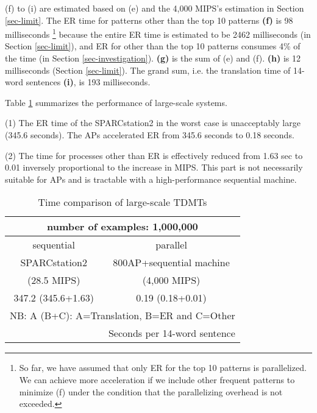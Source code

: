 (f) to (i) are estimated based on (e) and 
the 4,000  MIPS's estimation in Section \ref{sec-limit}.
The ER time for patterns other than the top 10 patterns 
{\bf (f)} is 98 milliseconds \footnote{
So far, we have assumed that only ER for the top 10 patterns is parallelized.
We can achieve more acceleration 
if we include other frequent patterns  to minimize (f) under the 
condition that the parallelizing overhead is not exceeded.}
because 
the entire ER time is estimated to be 
2462 milliseconds (in Section \ref{sec-limit}),
and ER for  other than the 
top 10 patterns consumes 4\% of the time (in Section \ref{sec-investigation}).
{\bf (g)} is the sum of (e) and (f).
{\bf (h)} is 12 milliseconds (Section \ref{sec-limit}).
The grand sum, i.e.  the translation time of  14-word sentences {\bf (i)},
is 193 milliseconds.

Table \ref{tbl-condition-large} summarizes the performance of
large-scale systems.

(1) The ER time of the 
SPARCstation2 in the worst case is unacceptably large (345.6 seconds).
The APs accelerated
ER from 345.6 seconds to  0.18 seconds.

(2) The time for processes other than ER  
is effectively reduced from 1.63 sec to 0.01 
inversely 
proportional to the increase in  MIPS.
This part is not necessarily suitable for APs and is tractable with 
a high-performance sequential machine.

\begin{table}[htb]
  \begin{center}
    \caption{Time comparison of large-scale TDMTs}
    \label{tbl-condition-large}
    \begin{tabular}{|c|c|} \hline
                 \multicolumn{2}{|c|}{number of examples: 1,000,000} \\ \hline
                 \multicolumn{1}{|c|}{sequential} & parallel \\ \hline
                 SPARCstation2  & 800AP+sequential machine\\[-1ex]
                 (28.5  MIPS)  & \hspace*{3em}(4,000  MIPS)\\ \hline
                 347.2 (345.6+1.63) & 0.19 (0.18+0.01) \\ \hline
    \multicolumn{2}{r}{NB: A (B+C): A=Translation, B=ER and C=Other}\\[-1ex]
    \multicolumn{2}{r}{Seconds per 14-word sentence}
    \end{tabular}
  \end{center}
\end{table}


